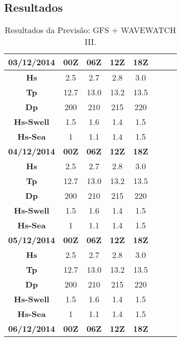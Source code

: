 \documentclass{article}
\begin{document}
\subsection{Resultados}


\begin{table}[H]
\renewcommand{\baselinestretch}{2}
\caption{\small Resultados da Previsão: GFS + WAVEWATCH III.}
\center 
\label{tabela_periodo}
    \begin{tabular}{| c | c | c | c | c | c | c | c |}
    \hline
    \rowcolor{Gray}
    \textbf{03/12/2014} & \textbf{00Z} & \textbf{06Z} & \textbf{12Z} & \textbf{18Z} \\ \hline \hline
    \textbf{Hs} & 2.5 & 2.7 & 2.8 & 3.0 \\ \hline
    \textbf{Tp} & 12.7 & 13.0 & 13.2 & 13.5 \\ \hline
    \textbf{Dp} & 200 & 210 & 215 &  220 \\ \hline
    \textbf{Hs-Swell} & 1.5 & 1.6 & 1.4 & 1.5 \\ \hline
    \textbf{Hs-Sea} & 1 & 1.1 & 1.4 & 1.5 \\ \hline
    \hline \hline
    \rowcolor{Gray}
    \textbf{04/12/2014} & \textbf{00Z} & \textbf{06Z} & \textbf{12Z} & \textbf{18Z} \\ \hline \hline
    \textbf{Hs} & 2.5 & 2.7 & 2.8 & 3.0 \\ \hline
    \textbf{Tp} & 12.7 & 13.0 & 13.2 & 13.5 \\ \hline
    \textbf{Dp} & 200 & 210 & 215 &  220 \\ \hline
    \textbf{Hs-Swell} & 1.5 & 1.6 & 1.4 & 1.5 \\ \hline
    \textbf{Hs-Sea} & 1 & 1.1 & 1.4 & 1.5 \\ \hline
    \hline \hline
    \rowcolor{Gray}
    \textbf{05/12/2014} & \textbf{00Z} & \textbf{06Z} & \textbf{12Z} & \textbf{18Z} \\ \hline \hline
    \textbf{Hs} & 2.5 & 2.7 & 2.8 & 3.0 \\ \hline
    \textbf{Tp} & 12.7 & 13.0 & 13.2 & 13.5 \\ \hline
    \textbf{Dp} & 200 & 210 & 215 &  220 \\ \hline
    \textbf{Hs-Swell} & 1.5 & 1.6 & 1.4 & 1.5 \\ \hline
    \textbf{Hs-Sea} & 1 & 1.1 & 1.4 & 1.5 \\ \hline
    \hline \hline
    \rowcolor{Gray}
    \textbf{06/12/2014} & \textbf{00Z} & \textbf{06Z} & \textbf{12Z} & \textbf{18Z} \\ \hline \hline

\end{tabular}
\end{table}
\end{document}
